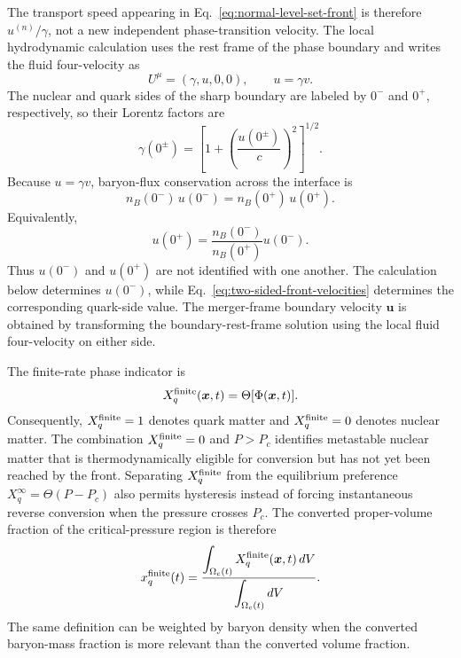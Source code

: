 \documentclass[11pt]{article}
\begin{document}
The transport speed appearing in Eq.~\eqref{eq:normal-level-set-front} is therefore \(u^{(n)}/\gamma\), not a new independent phase-transition velocity.
The local hydrodynamic calculation uses the rest frame of the phase boundary and writes the fluid four-velocity as
\begin{equation}
U^\mu=(\gamma,u,0,0),
\qquad
u=\gamma v.
\end{equation}
The nuclear and quark sides of the sharp boundary are labeled by \(0^-\) and \(0^+\), respectively, so their Lorentz factors are
\begin{equation}
\gamma(0^\pm)
=
\left[
1+
\left(\frac{u(0^\pm)}{c}\right)^2
\right]^{1/2}.
\end{equation}
Because \(u=\gamma v\), baryon-flux conservation across the interface is
\begin{equation}
n_B(0^-)\,u(0^-)
=
n_B(0^+)\,u(0^+).
\label{eq:relativistic-baryon-flux-front}
\end{equation}
Equivalently,
\begin{equation}
u(0^+)
=
\frac{n_B(0^-)}
{n_B(0^+)}
u(0^-).
\label{eq:two-sided-front-velocities}
\end{equation}
Thus \(u(0^-)\) and \(u(0^+)\) are not identified with one another.
The calculation below determines \(u(0^-)\), while Eq.~\eqref{eq:two-sided-front-velocities} determines the corresponding quark-side value.
The merger-frame boundary velocity \(\boldsymbol{u}\) is obtained by transforming the boundary-rest-frame solution using the local fluid four-velocity on either side.

The finite-rate phase indicator is
\begin{equation}
X_q^{\rm finite}(\boldsymbol{x},t)
=
\Theta[\Phi(\boldsymbol{x},t)].
\label{eq:finite-phase-indicator}
\end{equation}
Consequently, \(X_q^{\rm finite}=1\) denotes quark matter and \(X_q^{\rm finite}=0\) denotes nuclear matter.
The combination \(X_q^{\rm finite}=0\) and \(P>P_c\) identifies metastable nuclear matter that is thermodynamically eligible for conversion but has not yet been reached by the front.
Separating \(X_q^{\rm finite}\) from the equilibrium preference \(X_q^\infty=\Theta(P-P_c)\) also permits hysteresis instead of forcing instantaneous reverse conversion when the pressure crosses \(P_c\).
The converted proper-volume fraction of the critical-pressure region is therefore
\begin{equation}
x_q^{\rm finite}(t)
=
\frac{
\displaystyle
\int_{\Omega_c(t)}
X_q^{\rm finite}(\boldsymbol{x},t)\,dV
}{
\displaystyle
\int_{\Omega_c(t)}
dV
}.
\label{eq:generic-converted-fraction}
\end{equation}
The same definition can be weighted by baryon density when the converted baryon-mass fraction is more relevant than the converted volume fraction.
\end{document}
